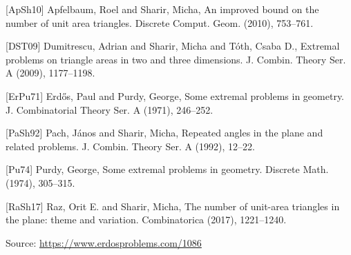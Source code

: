 \documentclass{article}
\begin{document}
 [ApSh10] Apfelbaum, Roel and Sharir, Micha, An improved bound on the number of unit area triangles. Discrete Comput. Geom. (2010), 753--761.
 
 [DST09] Dumitrescu, Adrian and Sharir, Micha and T\'oth, Csaba D., Extremal problems on triangle areas in two and three
dimensions. J. Combin. Theory Ser. A (2009), 1177--1198.
 
 [ErPu71] Erd\H{o}s, Paul and Purdy, George, Some extremal problems in geometry. J. Combinatorial Theory Ser. A (1971), 246--252.
 
 [PaSh92] Pach, J\'{a}nos and Sharir, Micha, Repeated angles in the plane and related problems. J. Combin. Theory Ser. A (1992), 12--22.
 
 [Pu74] Purdy, George, Some extremal problems in geometry. Discrete Math. (1974), 305--315.
 
 [RaSh17] Raz, Orit E. and Sharir, Micha, The number of unit-area triangles in the plane: theme and
variation. Combinatorica (2017), 1221--1240.

\bigskip
\noindent\small{Source: \url{https://www.erdosproblems.com/1086}}
\end{document}
